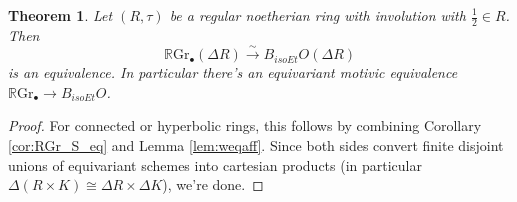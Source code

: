 \documentclass[edeposit,fullpage]{uiucthesis2009}
\newcommand{\mbb}{\mathbb}
\newcommand{\mc}{\mathcal}
\newcommand{\RGr}{\mathbb R\mathrm{Gr}}
\theoremstyle{plain}
\numberwithin{lemma}{section}
\newtheorem{theorem}[lemma]{Theorem}
\theoremstyle{definition}
\begin{document}
\begin{theorem}\label{thm:RGr_Bet}
Let $(R,\tau)$ be a regular noetherian ring with involution with
$\frac{1}{2} \in R$. Then
\[
\RGr_\bullet(\Delta R) \xrightarrow{\sim} B_{isoEt}O(\Delta R)
\]
is an equivalence.
In particular there's an equivariant motivic equivalence $\RGr_\bullet
\rightarrow B_{isoEt}O$.
\end{theorem}

\begin{proof}
For connected or hyperbolic rings, this follows by combining Corollary
\ref{cor:RGr_S_eq} and Lemma \ref{lem:weqaff}. Since both sides
convert finite disjoint unions of equivariant schemes into cartesian
products (in particular $\Delta(R
\times K) \cong \Delta R \times \Delta K$), we're done.
\end{proof}



\end{document}
